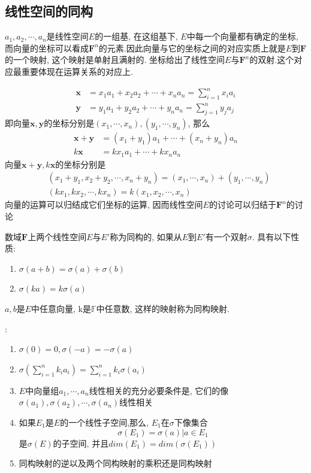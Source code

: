 \documentclass[a4paper,11pt]{article}
\theoremstyle{mystyle}
\begin{document}
\subsection{线性空间的同构}
$a_1,a_2,\cdots,a_n$是线性空间$E$的一组基, 在这组基下, $E$中每一个向量都有确定的坐标, 而向量的坐标可以看成$\mathbf{F}^n$的元素.因此向量与它的坐标之间的对应实质上就是$E$到$\mathbf{F}$的一个映射, 这个映射是单射且满射的. 坐标给出了线性空间$E$与$\mathbf{F}^n$的双射.这个对应最重要体现在运算关系的对应上.

\begin{equation*}
\begin{split}
   \mathbf{x}&=x_1a_1+x_2a_2+\cdots+x_na_n=\sum_{i=1}^{n}x_ia_i \\
   \mathbf{y}&=y_1a_1+y_2a_2+\cdots+y_na_n=\sum_{j=1}^{n}y_ja_j
\end{split}
\end{equation*}
即向量$\mathbf{x},\mathbf{y}$的坐标分别是$(x_1,\cdots,x_n),(y_1,\cdots,y_n)$, 那么
\begin{equation*}
\begin{split}
  \mathbf{x}+\mathbf{y}&=(x_1+y_1)a_1+\cdots+(x_n+y_n)a_n\\
  k\mathbf{x}&=kx_1a_1+\cdots+kx_na_n
\end{split}
\end{equation*}
向量$\mathbf{x}+\mathbf{y},k\mathbf{x}$的坐标分别是
\begin{equation*}
\begin{split}
  &(x_1+y_1,x_2+y_2,\cdots,x_n+y_n)=(x_1,\cdots,x_n)+(y_1,\cdots,y_n)\\
  &(kx_1,kx_2,\cdots,kx_n)=k(x_1,x_2,\cdots,x_n)
\end{split}
\end{equation*}
向量的运算可以归结成它们坐标的运算, 因而线性空间$E$的讨论可以归结于$\mathbf{F}^n$的讨论
\begin{definition}
  数域$\mathbf{F}$上两个线性空间$E$与$E'$称为同构的, 如果从$E$到$E'$有一个双射$\sigma$. 具有以下性质:
  \begin{enumerate}[(1)]
    \item $\sigma(a+b)=\sigma(a)+\sigma(b)$
    \item $\sigma(ka)=k\sigma(a)$
  \end{enumerate}
  $a,b$是$E$中任意向量, k是$\mathbb{F}$中任意数, 这样的映射称为同构映射.
\end{definition}
:
\begin{enumerate}[(1)]
  \item $\sigma(0)=0,\sigma(-a)=-\sigma(a)$
  \item $\sigma(\sum_{i=1}^{n}k_ia_i)=\sum_{i=1}^{n}k_i\sigma(a_i)$
  \item $E$中向量组$a_1,\cdots,a_n$线性相关的充分必要条件是, 它们的像$\sigma(a_1),\sigma(a_2),\cdots,\sigma(a_n)$线性相关
  \item 如果$E_1$是$E$的一个线性子空间,那么, $E_1$在$\sigma$下像集合
  \begin{equation*}
    \sigma(E_1)={\sigma(a)|a\in E_1}
  \end{equation*}
  是$\sigma(E)$的子空间, 并且$dim(E_1)=dim(\sigma(E_1))$
  \item 同构映射的逆以及两个同构映射的乘积还是同构映射
\end{enumerate}
\end{document}
